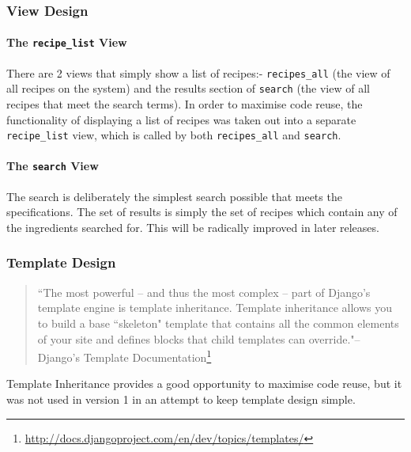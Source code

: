 \subsubsection{View Design}

\paragraph{The \texttt{recipe\_list} View}

There are 2 views that simply show a list of recipes:- \texttt{recipes\_all} (the view of all recipes on the system) and the results section of \texttt{search} (the view of all recipes that meet the search terms). In order to maximise code reuse, the functionality of displaying a list of recipes was taken out into a separate \texttt{recipe\_list} view, which is called by both \texttt{recipes\_all} and \texttt{search}.

\paragraph{The \texttt{search} View}

The search is deliberately the simplest search possible that meets the specifications. The set of results is simply the set of recipes which contain any of the ingredients searched for. This will be radically improved in later releases.

\subsubsection{Template Design}

\begin{quote}
``The most powerful -- and thus the most complex -- part of Django's template engine is template inheritance. Template inheritance allows you to build a base ``skeleton" template that contains all the common elements of your site and defines blocks that child templates can override."\flushright-- Django's Template Documentation\footnote{\url{http://docs.djangoproject.com/en/dev/topics/templates/}}
\end{quote}

\noindent Template Inheritance provides a good opportunity to maximise code reuse, but it was not used in version 1 in an attempt to keep template design simple.













